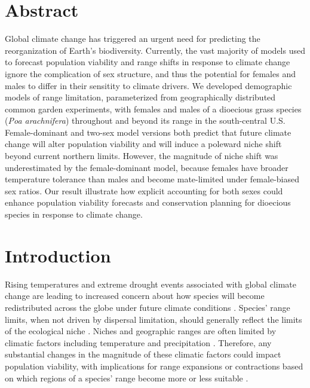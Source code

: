 \documentclass[12pt]{article}\usepackage[]{graphicx}\usepackage[dvipsnames]{xcolor}
\begin{document}
\section*{Abstract}
Global climate change has triggered an urgent need for predicting the reorganization of Earth's biodiversity.
Currently, the vast majority of models used to forecast population viability and range shifts in response to climate change ignore the complication of sex structure, and thus the potential for females and males to differ in their sensitity to climate drivers. 
We developed demographic models of range limitation, parameterized from geographically distributed common garden experiments, with females and males of a dioecious grass species (\textit{Poa arachnifera}) throughout and beyond its range in the south-central U.S. 
Female-dominant and two-sex model versions both predict that future climate change will alter population viability and will induce a poleward niche shift beyond current northern limits.
However, the magnitude of niche shift was underestimated by the female-dominant model, because females have broader temperature tolerance than males and become mate-limited under female-biased sex ratios.
Our result illustrate how explicit accounting for both sexes could enhance population viability forecasts and conservation planning for dioecious species in response to climate change.

\newpage
\section*{Introduction}
Rising temperatures and extreme drought events associated with global climate change are leading to increased concern about how species will become redistributed across the globe under future climate conditions \citep{bertrand2011changes,gamelon2017interactions,smith2024extreme}.
Species' range limits, when not driven by dispersal limitation, should generally reflect the limits of the ecological niche \citep{lee2016synthesis}.
Niches and geographic ranges are often limited by climatic factors including temperature and precipitation \citep{sexton2009evolution}. 
Therefore, any substantial changes in the magnitude of these climatic factors could impact population viability, with implications for range expansions or contractions based on which regions of a species' range become more or less suitable  \citep{davis2001range, pease1989model}. 
\end{document}
